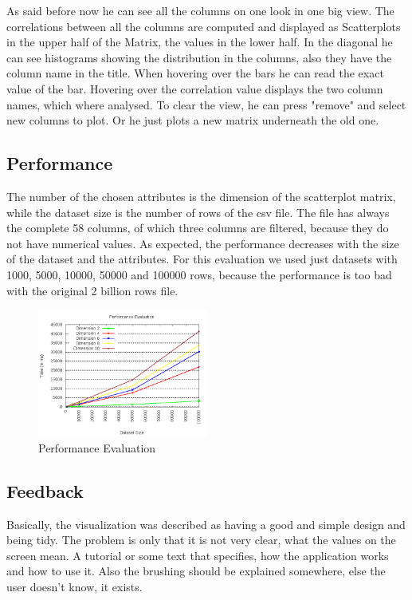 \documentclass{vgtc}                          %
\begin{document}
As said before now he can see all the columns on one look in one big view. The correlations between all the columns are computed and displayed as Scatterplots in the upper half of the Matrix, the values in the lower half. In the diagonal he can see histograms showing the distribution in the columns, also they have the column name in the title. When hovering over the bars he can read the exact value of the bar. Hovering over the correlation value displays the two column names, which where analysed. To clear the view, he can press "remove" and select new columns to plot. Or he just plots a new matrix underneath the old one.

\subsection{Performance}
The number of the chosen attributes is the dimension of the scatterplot matrix, while the dataset size is the number of rows of the csv file. The file has always the complete 58 columns, of which three columns are filtered, because they do not have numerical values. As expected, the performance decreases with the size of the dataset and the attributes. For this evaluation we used just datasets with 1000, 5000, 10000, 50000 and 100000 rows, because the performance is too bad with the original 2 billion rows file.

\begin{figure}[H]
\includegraphics[width=0.5\textwidth]{performance.png}
\centering
\caption{Performance Evaluation}
\end{figure}

\subsection{Feedback}
Basically, the visualization was described as having a good and simple design and being tidy. The problem is only that it is not very clear, what the values on the screen mean. A tutorial or some text that specifies, how the application works and how to use it. Also the brushing should be explained somewhere, else the user doesn't know, it exists.
\end{document}
